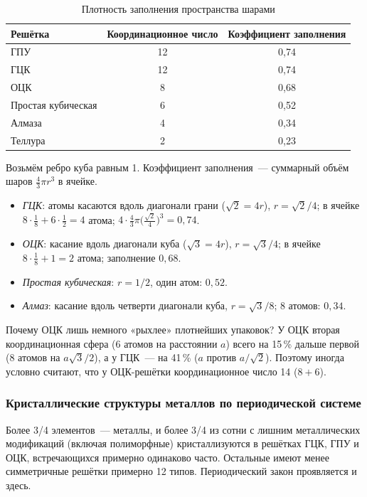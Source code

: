 \begin{table}[ht]
\centering
\caption{Плотность заполнения пространства шарами}
\label{tab:packing}
\small
\begin{tabular}{@{}lcc@{}}
\toprule
Решётка & Координационное число & Коэффициент заполнения \\
\midrule
ГПУ & 12 & 0,74 \\
ГЦК & 12 & 0,74 \\
ОЦК & 8 & 0,68 \\
Простая кубическая & 6 & 0,52 \\
Алмаза & 4 & 0,34 \\
Теллура & 2 & 0,23 \\
\bottomrule
\end{tabular}
\end{table}

\begin{primer}
Возьмём ребро куба равным 1. Коэффициент заполнения~— суммарный объём
шаров $\frac43\pi r^3$ в ячейке.
\begin{itemize}
\item \emph{ГЦК}: атомы касаются вдоль диагонали грани ($\sqrt2=4r$),
$r=\sqrt2/4$; в ячейке $8\cdot\frac18+6\cdot\frac12=4$ атома;
$4\cdot\frac43\pi\bigl(\frac{\sqrt2}{4}\bigr)^3=0{,}74$.
\item \emph{ОЦК}: касание вдоль диагонали куба ($\sqrt3=4r$), $r=\sqrt3/4$;
в ячейке $8\cdot\frac18+1=2$ атома; заполнение $0{,}68$.
\item \emph{Простая кубическая}: $r=1/2$, один атом: $0{,}52$.
\item \emph{Алмаз}: касание вдоль четверти диагонали куба, $r=\sqrt3/8$;
8 атомов: $0{,}34$.
\end{itemize}
\end{primer}

Почему ОЦК лишь немного «рыхлее» плотнейших упаковок? У ОЦК вторая
координационная сфера (6 атомов на расстоянии $a$) всего на 15\,\%
дальше первой (8 атомов на $a\sqrt3/2$), а у ГЦК~— на 41\,\% ($a$ против
$a/\sqrt2$). Поэтому иногда условно считают, что у ОЦК-решётки
координационное число 14 ($8+6$).

\subsubsection{Кристаллические структуры металлов по периодической системе}

Более 3/4 элементов~— металлы, и более 3/4 из сотни с лишним
металлических модификаций (включая полиморфные) кристаллизуются в
решётках ГЦК, ГПУ и ОЦК, встречающихся примерно одинаково часто.
Остальные имеют менее симметричные решётки примерно 12 типов.
Периодический закон проявляется и здесь.


